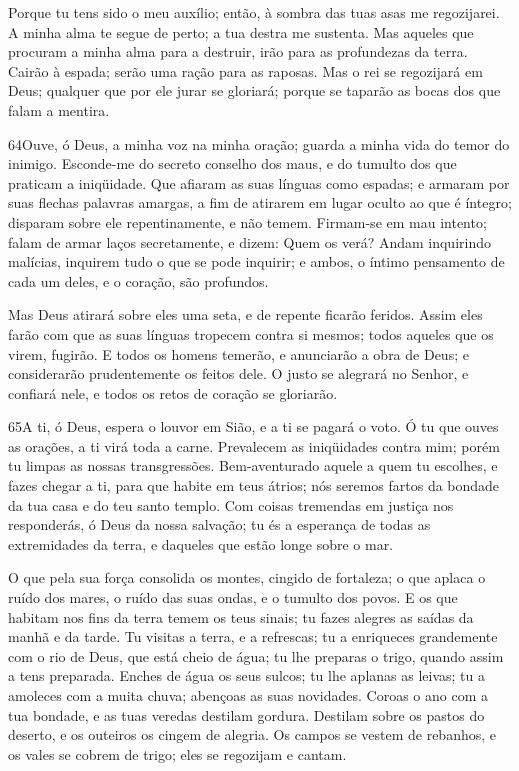 Porque tu tens sido o meu auxílio; então, à sombra das tuas asas
me regozijarei. A minha alma te segue de perto; a tua destra me
sustenta. Mas aqueles que procuram a minha alma para a destruir,
irão para as profundezas da terra. Cairão à espada; serão uma
ração para as raposas. Mas o rei se regozijará em Deus;
qualquer que por ele jurar se gloriará; porque se taparão as bocas
dos que falam a mentira.

\bigskip

\lettrine{64}{}Ouve, ó Deus, a minha voz na minha oração;
guarda a minha vida do temor do inimigo. Esconde-me do secreto
conselho dos maus, e do tumulto dos que praticam a iniqüidade.
Que afiaram as suas línguas como espadas; e armaram por suas
flechas palavras amargas, a fim de atirarem em lugar oculto ao
que é íntegro; disparam sobre ele repentinamente, e não temem.
Firmam-se em mau intento; falam de armar laços secretamente, e
dizem: Quem os verá? Andam inquirindo malícias, inquirem tudo o
que se pode inquirir; e ambos, o íntimo pensamento de cada um deles,
e o coração, são profundos.

Mas Deus atirará sobre eles uma seta, e de repente ficarão
feridos. Assim eles farão com que as suas línguas tropecem
contra si mesmos; todos aqueles que os virem, fugirão. E todos
os homens temerão, e anunciarão a obra de Deus; e considerarão
prudentemente os feitos dele. O justo se alegrará no Senhor,
e confiará nele, e todos os retos de coração se gloriarão.

\bigskip

\lettrine{65}{}A ti, ó Deus, espera o louvor em Sião, e a ti se
pagará o voto. Ó tu que ouves as orações, a ti virá toda a
carne. Prevalecem as iniqüidades contra mim; porém tu limpas as
nossas transgressões. Bem-aventurado aquele a quem tu escolhes,
e fazes chegar a ti, para que habite em teus átrios; nós seremos
fartos da bondade da tua casa e do teu santo templo. Com coisas
tremendas em justiça nos responderás, ó Deus da nossa salvação; tu
és a esperança de todas as extremidades da terra, e daqueles que
estão longe sobre o mar.


O que pela sua força consolida os montes, cingido de fortaleza;
o que aplaca o ruído dos mares, o ruído das suas ondas, e o
tumulto dos povos. E os que habitam nos fins da terra temem os
teus sinais; tu fazes alegres as saídas da manhã e da tarde. Tu
visitas a terra, e a refrescas; tu a enriqueces grandemente com o
rio de Deus, que está cheio de água; tu lhe preparas o trigo, quando
assim a tens preparada. Enches de água os seus sulcos; tu lhe
aplanas as leivas; tu a amoleces com a muita chuva; abençoas as suas
novidades. Coroas o ano com a tua bondade, e as tuas veredas
destilam gordura. Destilam sobre os pastos do deserto, e os
outeiros os cingem de alegria. Os campos se vestem de
rebanhos, e os vales se cobrem de trigo; eles se regozijam e cantam.

